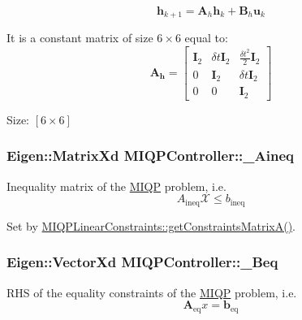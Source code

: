 \[ \mathbf{h}_{k+1} = \mathbf{A}_h \mathbf{h}_k + \mathbf{B}_h \mathbf{u}_k \]

\-It is a constant matrix of size $6\times6$ equal to\-: \[ \mathbf{A_h} = \left[ \begin{array}{ccc} \mathbf{I}_2 & \delta t \mathbf{I}_2 & \frac{\delta t^2}{2} \mathbf{I}_2 \\ 0 & \mathbf{I}_2 & \delta t \mathbf{I}_2 \\ 0 & 0 & \mathbf{I}_2 \end{array} \right] \]

\-Size\-: $[6\times6]$ \hypertarget{classMIQPController_a7678fd8e1c08986d7ae0dc1a884040e1}{
\subsubsection[{\-\_\-\-Aineq}]{\setlength{\rightskip}{0pt plus 5cm}\-Eigen\-::\-Matrix\-Xd {\bf \-M\-I\-Q\-P\-Controller\-::\-\_\-\-Aineq}}}\label{classMIQPController_a7678fd8e1c08986d7ae0dc1a884040e1}
\-Inequality matrix of the \hyperlink{namespaceMIQP}{\-M\-I\-Q\-P} problem, i.\-e. \[ A_{\text{ineq}} \mathcal{X} \leq b_{\text{ineq}} \]

\-Set by \hyperlink{classMIQPLinearConstraints_ab556e990dcc0b1fcd152f41a8c00e1f6}{\-M\-I\-Q\-P\-Linear\-Constraints\-::get\-Constraints\-Matrix\-A()}. \hypertarget{classMIQPController_a59bee510bcc945ad2267a82ec2116d79}{
\subsubsection[{\-\_\-\-Beq}]{\setlength{\rightskip}{0pt plus 5cm}\-Eigen\-::\-Vector\-Xd {\bf \-M\-I\-Q\-P\-Controller\-::\-\_\-\-Beq}}}\label{classMIQPController_a59bee510bcc945ad2267a82ec2116d79}
\-R\-H\-S of the equality constraints of the \hyperlink{namespaceMIQP}{\-M\-I\-Q\-P} problem, i.\-e. \[ \mathbf{A}_{\text{eq}} x = \mathbf{b}_{\text{eq}} \]

